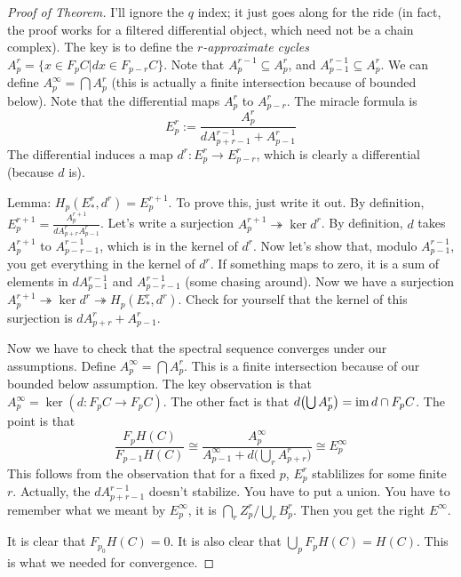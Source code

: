 \begin{proof}[Proof of Theorem]
 I'll ignore the $q$ index; it just goes along for the ride (in fact, the proof works for a filtered differential object, which need not be a chain complex).
 The key is to define the \emph{$r$-approximate cycles} $A_p^r=\{x\in F_pC|dx\in F_{p-r}C\}$. Note that $A^{r-1}_p\subseteq A^r_p$, and $A^{r-1}_{p-1}\subseteq A^r_p$. We can define $A^\infty_p = \bigcap A^r_p$ (this is actually a finite intersection because of bounded below). Note that the differential maps $A^r_p$ to $A^r_{p-r}$. The miracle formula is
 \[
  E^r_p := \frac{A_p^r}{d A^{r-1}_{p+r-1} + A_{p-1}^r}
 \]
 The differential induces a map $d^r\colon E^r_p\to E^r_{p-r}$, which is clearly a differential (because $d$ is).
 
 Lemma: $H_p(E_*^r,d^r) = E^{r+1}_p$. To prove this, just write it out. By definition, $E_p^{r+1} = \frac{A^{r+1}_p}{d A^r_{p+r} A^r_{p-1}}$. Let's write a surjection $A^{r+1}_p\twoheadrightarrow \ker d^r$. By definition, $d$ takes $A^{r+1}_p$ to $A^{r-1}_{p-r-1}$, which is in the kernel of $d^r$. Now let's show that, modulo $A^{r-1}_{p-1}$, you get everything in the kernel of $d^r$. If something maps to zero, it is a sum of elements in $d A^{r-1}_{p-1}$ and $A^{r-1}_{p-r-1}$ (some chasing around). Now we have a surjection $A^{r+1}_p\twoheadrightarrow \ker d^r\twoheadrightarrow H_p(E_*^r,d^r)$. Check for yourself that the kernel of this surjection is $d A^r_{p+r}+A^r_{p-1}$.
 
 Now we have to check that the spectral sequence converges under our assumptions. Define $A^\infty_p = \bigcap A^r_p$. This is a finite intersection because of our bounded below assumption. The key observation is that $A^\infty_p = \ker(d\colon F_pC\to F_pC)$. The other fact is that $d\bigl(\bigcup A_p^r\bigr) = \operatorname{im} d \cap F_p C$. The point is that 
 \[
  \frac{F_p H(C)}{F_{p-1}H(C)} \cong \frac{A^\infty_p}{A^\infty_{p-1}+d\bigl(\bigcup_r A^r_{p+r}\bigr)} \cong E^\infty_p
 \]
 This follows from the observation that for a fixed $p$, $E^r_p$ stablilizes for some finite $r$. Actually, the $dA^{r-1}_{p+r-1}$ doesn't stabilize. You have to put a union. You have to remember what we meant by $E^\infty_p$, it is $\bigcap_r Z^r_p/\bigcup_r B^r_p$. Then you get the right $E^\infty$.
 
 It is clear that $F_{p_0}H(C)=0$. It is also clear that $\bigcup_p F_p H(C)=H(C)$. This is what we needed for convergence.
\end{proof}

